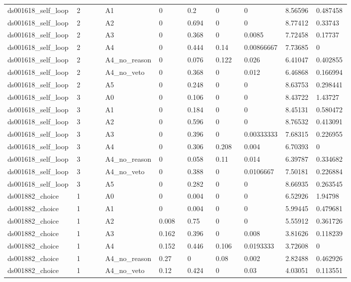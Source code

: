 \documentclass[11pt]{article}
\begin{document}
\begin{landscape}
\begin{longtable}{@{}L{0.120\linewidth}L{0.085\linewidth}L{0.085\linewidth}L{0.085\linewidth}L{0.085\linewidth}L{0.085\linewidth}L{0.085\linewidth}L{0.085\linewidth}L{0.085\linewidth}@{}}
ds001618\_self\_loop & 2 & A1 & 0 & 0.2 & 0 & 0 & 8.56596 & 0.487458 \\
ds001618\_self\_loop & 2 & A2 & 0 & 0.694 & 0 & 0 & 8.77412 & 0.33743 \\
ds001618\_self\_loop & 2 & A3 & 0 & 0.368 & 0 & 0.0085 & 7.72458 & 0.17737 \\
ds001618\_self\_loop & 2 & A4 & 0 & 0.444 & 0.14 & 0.00866667 & 7.73685 & 0 \\
ds001618\_self\_loop & 2 & A4\_no\_reason & 0 & 0.076 & 0.122 & 0.026 & 6.41047 & 0.402855 \\
ds001618\_self\_loop & 2 & A4\_no\_veto & 0 & 0.368 & 0 & 0.012 & 6.46868 & 0.166994 \\
ds001618\_self\_loop & 2 & A5 & 0 & 0.248 & 0 & 0 & 8.63753 & 0.298441 \\
ds001618\_self\_loop & 3 & A0 & 0 & 0.106 & 0 & 0 & 8.43722 & 1.43727 \\
ds001618\_self\_loop & 3 & A1 & 0 & 0.184 & 0 & 0 & 8.45131 & 0.580472 \\
ds001618\_self\_loop & 3 & A2 & 0 & 0.596 & 0 & 0 & 8.76532 & 0.413091 \\
ds001618\_self\_loop & 3 & A3 & 0 & 0.396 & 0 & 0.00333333 & 7.68315 & 0.226955 \\
ds001618\_self\_loop & 3 & A4 & 0 & 0.306 & 0.208 & 0.004 & 6.70393 & 0 \\
ds001618\_self\_loop & 3 & A4\_no\_reason & 0 & 0.058 & 0.11 & 0.014 & 6.39787 & 0.334682 \\
ds001618\_self\_loop & 3 & A4\_no\_veto & 0 & 0.388 & 0 & 0.0106667 & 7.50181 & 0.226884 \\
ds001618\_self\_loop & 3 & A5 & 0 & 0.282 & 0 & 0 & 8.66935 & 0.263545 \\
ds001882\_choice & 1 & A0 & 0 & 0.004 & 0 & 0 & 6.52926 & 1.94798 \\
ds001882\_choice & 1 & A1 & 0 & 0.004 & 0 & 0 & 5.99445 & 0.479681 \\
ds001882\_choice & 1 & A2 & 0.008 & 0.75 & 0 & 0 & 5.55912 & 0.361726 \\
ds001882\_choice & 1 & A3 & 0.162 & 0.396 & 0 & 0.008 & 3.81626 & 0.118239 \\
ds001882\_choice & 1 & A4 & 0.152 & 0.446 & 0.106 & 0.0193333 & 3.72608 & 0 \\
ds001882\_choice & 1 & A4\_no\_reason & 0.27 & 0 & 0.08 & 0.002 & 2.82488 & 0.462926 \\
ds001882\_choice & 1 & A4\_no\_veto & 0.12 & 0.424 & 0 & 0.03 & 4.03051 & 0.113551 \\

\end{longtable}
\end{landscape}
\end{document}
